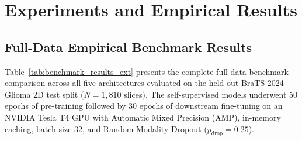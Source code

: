 \documentclass{article}
\begin{document}
\section{Experiments and Empirical Results}

\subsection{Full-Data Empirical Benchmark Results}

Table~\ref{tab:benchmark_results_ext} presents the complete full-data benchmark comparison across all five architectures evaluated on the held-out BraTS 2024 Glioma 2D test split ($N=1,810$ slices). The self-supervised models underwent 50 epochs of pre-training followed by 30 epochs of downstream fine-tuning on an NVIDIA Tesla T4 GPU with Automatic Mixed Precision (AMP), in-memory caching, batch size 32, and Random Modality Dropout ($p_{\text{drop}} = 0.25$).

\begin{table}[ht]
\centering
\caption{Full-data empirical benchmark comparison of throughput, latency, representation collapse probes, and downstream segmentation metrics on 2D multi-modal BraTS Glioma MRI under Random Modality Dropout ($p_{\text{drop}} = 0.25$). All models were evaluated on the held-out test split ($N=1,810$ slices) following full GPU training on NVIDIA Tesla T4 with AMP. Best per column is formatted in \textbf{bold}.}
\label{tab:benchmark_results_ext}
\vspace{0.5em}
\end{table}
\end{document}
